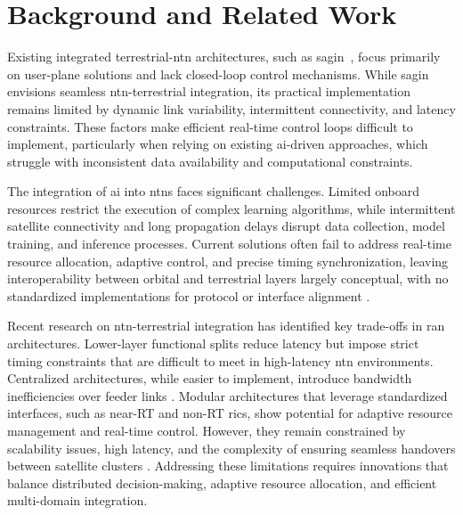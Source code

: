 \section{Background and Related Work}
\label{sec:background}

Existing integrated terrestrial-\gls{ntn} architectures, such as \gls{sagin}~\cite{cui2022architecture}, focus primarily on user-plane solutions and lack closed-loop control mechanisms. While \gls{sagin} envisions seamless \gls{ntn}-terrestrial integration, its practical implementation remains limited by dynamic link variability, intermittent connectivity, and latency constraints. These factors make efficient real-time control loops difficult to implement, particularly when relying on existing \gls{ai}-driven approaches, which struggle with inconsistent data availability and computational constraints.

The integration of \gls{ai} into \glspl{ntn} faces significant challenges. Limited onboard resources restrict the execution of complex learning algorithms, while intermittent satellite connectivity and long propagation delays disrupt data collection, model training, and inference processes. Current solutions often fail to address real-time resource allocation, adaptive control, and precise timing synchronization, leaving interoperability between orbital and terrestrial layers largely conceptual, with no standardized implementations for protocol or interface alignment \cite{10716597}.

Recent research on \gls{ntn}-terrestrial integration has identified key trade-offs in \gls{ran} architectures. Lower-layer functional splits reduce latency but impose strict timing constraints that are difficult to meet in high-latency \gls{ntn} environments. Centralized architectures, while easier to implement, introduce bandwidth inefficiencies over feeder links \cite{Muro2024}. Modular architectures that leverage standardized interfaces, such as near-RT and non-RT \glspl{ric}, show potential for adaptive resource management and real-time control. However, they remain constrained by scalability issues, high latency, and the complexity of ensuring seamless handovers between satellite clusters \cite{oranntn2025}. Addressing these limitations requires innovations that balance distributed decision-making, adaptive resource allocation, and efficient multi-domain integration.

